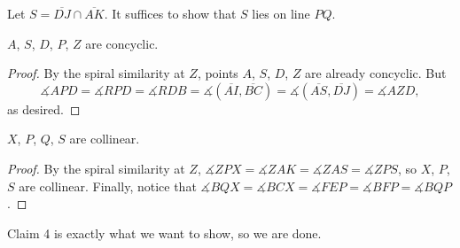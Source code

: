 Let $S=\overline{DJ}\cap\overline{AK}$. It suffices to show that $S$ lies on line $PQ$.
\begin{claim}
    $A$, $S$, $D$, $P$, $Z$ are concyclic.
\end{claim}
\begin{proof}
    By the spiral similarity at $Z$, points $A$, $S$, $D$, $Z$ are already concyclic. But \[\measuredangle APD=\measuredangle RPD=\measuredangle RDB=\measuredangle(\overline{AI},\overline{BC})=\measuredangle(\overline{AS},\overline{DJ})=\measuredangle AZD,\]
    as desired.
\end{proof}
\begin{claim}
    $X$, $P$, $Q$, $S$ are collinear.
\end{claim}
\begin{proof}
    By the spiral similarity at $Z$, $\measuredangle ZPX=\measuredangle ZAK=\measuredangle ZAS=\measuredangle ZPS$, so $X$, $P$, $S$ are collinear. Finally, notice that $\measuredangle BQX=\measuredangle BCX=\measuredangle FEP=\measuredangle BFP=\measuredangle BQP$.
\end{proof}

Claim 4 is exactly what we want to show, so we are done.

